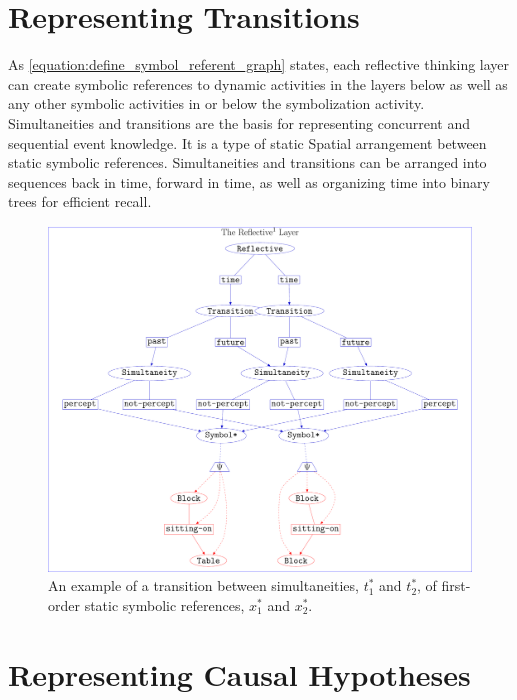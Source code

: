 \section{Representing Transitions}

As {\mbox{\autoref{equation:define_symbol_referent_graph}}} states,
each reflective thinking layer can create symbolic references to
dynamic activities in the layers below as well as any other symbolic
activities in or below the symbolization activity.  Simultaneities and
transitions are the basis for representing concurrent and sequential
event knowledge.  It is a type of static Spatial arrangement between
static symbolic references.  Simultaneities and transitions can be
arranged into sequences back in time, forward in time, as well as
organizing time into binary trees for efficient recall.
\begin{figure}
\center
\includegraphics[width=12cm]{gfx/example_transition}
\caption[An example of a transition between simultaneities.]{An
  example of a transition between simultaneities, $t_1^*$ and $t_2^*$,
  of first-order static symbolic references, $x_1^*$ and $x_2^*$.}
\label{figure:example_transition}
\end{figure}

\section{Representing Causal Hypotheses}

